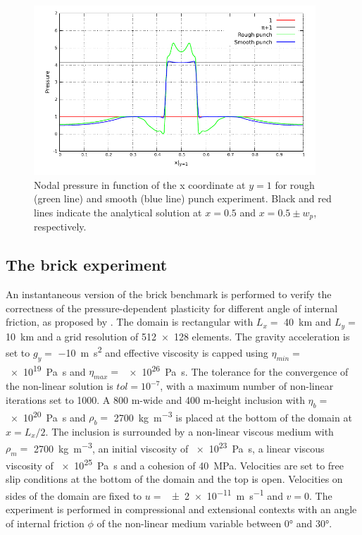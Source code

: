 \documentclass[hidelinks,10pt,a4paper]{article}
\begin{document}
\begin{figure}
\centering
\noindent\includegraphics[width=400px]{./Figures/Smooth_Rough.pdf}
\caption{Nodal pressure in function of the x coordinate at $y=1$ for rough (green line) and smooth (blue line) punch experiment. Black and red lines indicate
the analytical solution at $x=0.5$ and $x=0.5 \pm w_p$, respectively.}
\label{fig:smooth_p}
\end{figure}

\subsection{The brick experiment}\label{sec:brick}
An instantaneous version of the brick benchmark is performed to verify the correctness of the pressure-dependent plasticity for different angle of internal
friction, as proposed by \citet{Glerum2018}. The domain is rectangular with $L_x=$ \SI{40}{\km} and $L_y=$ \SI{10}{\km} and a grid resolution of \num{512x128}
elements. The gravity acceleration is set to $g_y=$ \SI{-10}{\m\square\s} and effective viscosity is capped using $\eta_{min}=$ \SI{e19}{\pascal\s} and
$\eta_{max}=$ \SI{e26}{\pascal\s}. The tolerance for the convergence of the non-linear solution is $tol=10^{-7}$, with a maximum number of non-linear iterations
set to 1000. A 800 m-wide and 400 m-height inclusion with $\eta_b=$ \SI{e20}{\pascal\s} and $\rho_b=$ \SI{2700}{\kg\per\cubic\m} is placed at the bottom of the
domain at $x=L_x/2$. The inclusion is surrounded by a non-linear viscous medium with $\rho_m=$ \SI{2700}{\kg\per\cubic\m}, an initial viscosity of
\SI{e23}{\pascal\s}, a linear viscous viscosity of \SI{e25}{\pascal\s} and a cohesion of \SI{40}{\mega\pascal}. Velocities are set to free slip conditions at
the bottom of the domain and the top is open. Velocities on sides of the domain are fixed to $u=$ \SI{+-2e-11}{\m\per\s} and $v=0$. The experiment is performed
in compressional and extensional contexts with an angle of internal friction $\phi$ of the non-linear medium variable between 0° and 30°.
\end{document}
